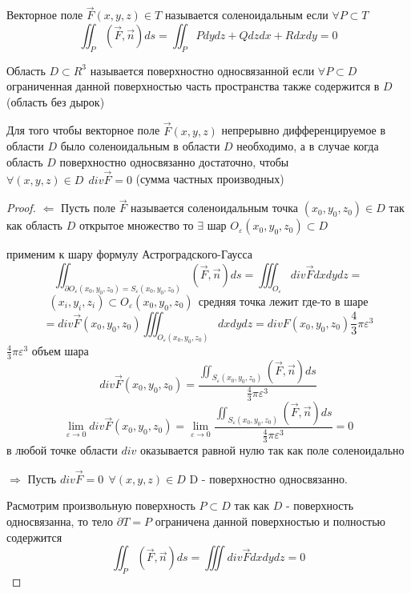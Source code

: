 \begin{define}[соленоидальности]
  Векторное поле $\vec F(x,y,z) \in T$ называется соленоидальным если
  $\forall P \subset T$
  $$
  \iint_P (\vec F, \vec n) ds = \iint_P Pdydz + Q dzdx + R dxdy = 0
  $$
\end{define}

\begin{define}
  Область $D \subset R^3$ называется поверхностно односвязанной если
  $\forall P \subset D$ ограниченная данной поверхностью часть пространства
  также содержится в $D$ (область без дырок)
\end{define}

\begin{block}
  Для того чтобы векторное поле $\vec F(x,y,z)$ непрерывно дифференцируемое в
  области $D$ было соленоидальным в области $D$ необходимо, а в случае когда
  область $D$ поверхностно односвязанно достаточно, чтобы
  $\forall (x,y,z) \in D ~~ div \vec F = 0$ (сумма частных производных)
\end{block}

\begin{proof}
  $\Leftarrow$ Пусть поле $\vec F$ называется соленоидальным точка
  $(x_0, y_0, z_0) \in D$ так как область $D$ открытое множество то $\exists$
  шар $O_{\varepsilon}(x_0, y_0, z_0) \subset D$

  применим к шару формулу Астроградского-Гаусса
  $$
  \iint_{\partial O_{\varepsilon}(x_0, y_0, z_0) =
  S_{\varepsilon}(x_0, y_0, z_0)} (\vec F, \vec n) ds =
  \iiint_{O_{\varepsilon}} div \vec F dxdydz =
  $$
  $$
  (x_i, y_i, z_i) \subset O_{\varepsilon}(x_0, y_0, z_0) ~~ \text{средняя точка
  лежит где-то в шаре}
  $$
  $$
  = div \vec F(x_0, y_0, z_0) \iiint_{O_{\varepsilon}(x_0, y_0, z_0)} dxdydz =
  div F(x_0, y_0, z_0) \frac{4}{3} \pi \varepsilon^3
  $$
  $\frac{4}{3} \pi \varepsilon^3$ объем шара
  $$
  div \vec F(x_0, y_0, z_0) = \frac{\iint_{S_{\varepsilon}(x_0, y_0, z_0)}
  (\vec F, \vec n) ds}{\frac{4}{3} \pi \varepsilon^3}
  $$
  $$
  \lim_{\varepsilon \to 0} div \vec F(x_0, y_0, z_0) = \lim_{\varepsilon \to 0}
  \frac{\iint_{S_{\varepsilon}(x_0, y_0, z_0)}(\vec F, \vec n) ds}
  {\frac{4}{3} \pi \varepsilon^3} = 0
  $$
  в любой точке области $div$ оказывается равной нулю так как поле соленоидально

  $\Rightarrow$ Пусть $div \vec F = 0 ~~ \forall (x,y,z) \in D$ D - поверхностно
  односвязанно.

  Расмотрим произвольную поверхность $P \subset D$ так как $D$ - поверхность
  односвязанна, то тело $\partial T = P$ ограничена данной поверхностью и
  полностью содержится
  $$
  \iint_P (\vec F, \vec n) ds = \iiint div \vec F dx dy dz = 0
  $$
\end{proof}


